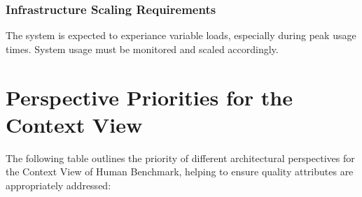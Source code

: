 
\subsubsection{Infrastructure Scaling Requirements}

The system is expected to experiance variable loads, especially during peak usage times. System usage must be monitored and scaled accordingly.





\section{Perspective Priorities for the Context View}

The following table outlines the priority of different architectural perspectives for the Context View of Human Benchmark, helping to ensure quality attributes are appropriately addressed:



